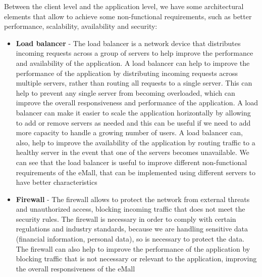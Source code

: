 Between the client level and the application level, we have some architectural elements that allow to achieve some non-functional requirements, such as better performance, scalability, availability and security:
\begin{itemize}
    \item \textbf{Load balancer} - The load balancer is a network device that distributes incoming requests across a group of servers to help improve the performance and availability of the application. A load balancer can help to improve the performance of the application by distributing incoming requests across multiple servers, rather than routing all requests to a single server. This can help to prevent any single server from becoming overloaded, which can improve the overall responsiveness and performance of the application. A load balancer can make it easier to scale the application horizontally by allowing to add or remove servers as needed and this can be useful if we need to add more capacity to handle a growing number of users. A load balancer can, also, help to improve the availability of the application by routing traffic to a healthy server in the event that one of the servers becomes unavailable. We can see that the load balancer is useful to improve different non-functional requirements of the eMall, that can be implemented using different servers to have better characteristics 
    \item \textbf{Firewall} - The firewall allows to protect the network from external threats and unauthorized access, blocking incoming traffic that does not meet the security rules. The firewall is necessary in order to comply with certain regulations and industry standards, because we are handling sensitive data (financial information, personal data), so is necessary to protect the data. The firewall can also help to improve the performance of the application by blocking traffic that is not necessary or relevant to the application, improving the overall responsiveness of the eMall
\end{itemize}

